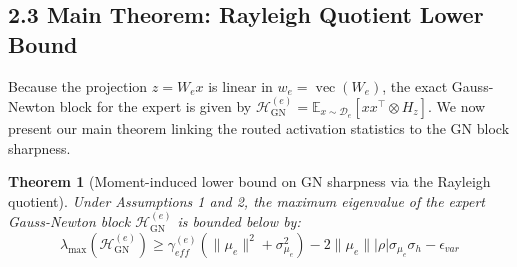 \documentclass[11pt]{article}
\newtheorem{theorem}{Theorem}
\begin{document}
\subsection*{2.3 Main Theorem: Rayleigh Quotient Lower Bound}

Because the projection $z=W_e x$ is linear in $w_e=\operatorname{vec}(W_e)$, the exact Gauss-Newton block for the expert is given by $\mathcal{H}_{\mathrm{GN}}^{(e)} = \mathbb{E}_{x \sim \mathcal{D}_e}[xx^\top \otimes H_z]$. We now present our main theorem linking the routed activation statistics to the GN block sharpness.

\begin{theorem}[Moment-induced lower bound on GN sharpness via the Rayleigh quotient] \label{thm:rayleigh}
Under Assumptions 1 and 2, the maximum eigenvalue of the expert Gauss-Newton block $\mathcal{H}_{\mathrm{GN}}^{(e)}$ is bounded below by:
\begin{equation}
    \lambda_{\max}(\mathcal{H}_{\mathrm{GN}}^{(e)}) \ge \gamma_{eff}^{(e)}(\|\mu_e\|^2 + \sigma_{\mu_e}^2) - 2\|\mu_e\| |\rho| \sigma_{\mu_e} \sigma_h - \epsilon_{var}
\end{equation}
\end{theorem}
\end{document}

